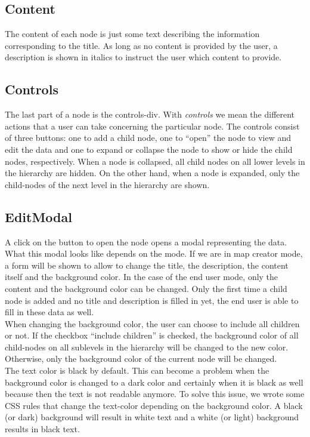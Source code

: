 \subsection{Content}\label{sec:content}
The content of each node is just some text describing the information corresponding to the title. As long as no content is provided by the user, a description is shown in italics to instruct the user which content to provide.



\subsection{Controls}\label{sec:controls}
The last part of a node is the controls-div. With \textit{controls} we mean the different actions that a user can take concerning the particular node. The controls consist of three buttons: one to add a child node, one to ``open'' the node to view and edit the data and one to expand or collapse the node to show or hide the child nodes, respectively. When a node is collapsed, all child nodes on all lower levels in the hierarchy are hidden. On the other hand, when a node is expanded, only the child-nodes of the next level in the hierarchy are shown.



\subsection{EditModal}\label{sec:editmodal}
A click on the button to open the node opens a modal representing the data. What this modal looks like depends on the mode. If we are in map creator mode, a form will be shown to allow to change the title, the description, the content itself and the background color. In the case of the end user mode, only the content and the background color can be changed. Only the first time a child node is added and no title and description is filled in yet, the end user is able to fill in these data as well.\\

When changing the background color, the user can choose to include all children or not. If the checkbox ``include children'' is checked, the background color of all child-nodes on all sublevels in the hierarchy will be changed to the new color. Otherwise, only the background color of the current node will be changed.\\

The text color is black by default. This can become a problem when the background color is changed to a dark color and certainly when it is black as well because then the text is not readable anymore. To solve this issue, we wrote some CSS rules that change the text-color depending on the background color. A black (or dark) background will result in white text and a white (or light) background results in black text.
 


